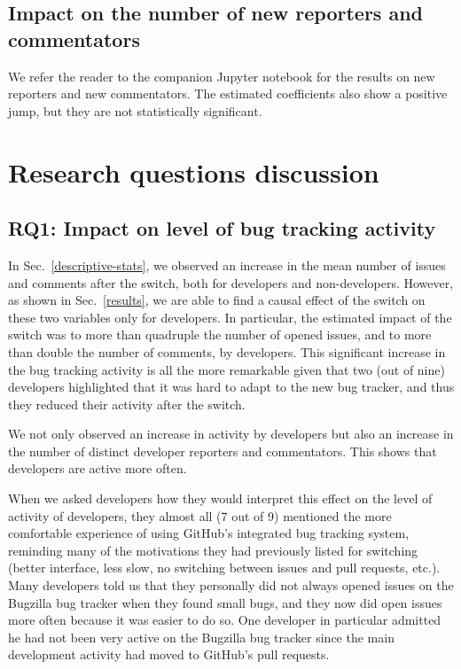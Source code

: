 \documentclass[conference]{IEEEtran}
\begin{document}
\subsection{Impact on the number of new reporters and commentators}

We refer the reader to the companion Jupyter notebook for the results on new reporters and new commentators. The estimated coefficients also show a positive jump, but they are not statistically significant.

\section{Research questions discussion}
\label{discussion}

\subsection{RQ1: Impact on level of bug tracking activity}

In Sec.~\ref{descriptive-stats}, we observed an increase in the mean number of issues and comments after the switch, both for developers and non-developers. However, as shown in Sec.~\ref{results}, we are able to find a causal effect of the switch on these two variables only for developers. In particular, the estimated impact of the switch was to more than quadruple the number of opened issues, and to more than double the number of comments, by developers. This significant increase in the bug tracking activity is all the more remarkable given that two (out of nine) developers highlighted that it was hard to adapt to the new bug tracker, and thus they reduced their activity after the switch.

We not only observed an increase in activity by developers but also an increase in the number of distinct developer reporters and commentators. This shows that developers are active more often.

When we asked developers how they would interpret this effect on the level of activity of developers, they almost all (7 out of 9) mentioned the more comfortable experience of using GitHub's integrated bug tracking system, reminding many of the motivations they had previously listed for switching (better interface, less slow, no switching between issues and pull requests, etc.). Many developers told us that they personally did not always opened issues on the Bugzilla bug tracker when they found small bugs, and they now did open issues more often because it was easier to do so. One developer in particular admitted he had not been very active on the Bugzilla bug tracker since the main development activity had moved to GitHub's pull requests.
\end{document}
